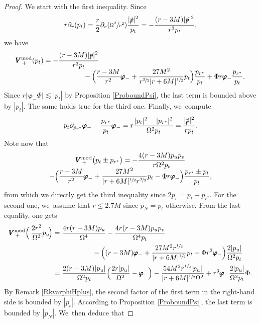 \documentclass[JEP,XML,SOM,Unicode,published]{cedram}
\theoremstyle{plain}
\theoremstyle{definition}
\begin{document}
\begin{proof}
We start with the first inequality. Since
\begin{equation*}
r\partial_r (p_t) = \frac{r}{2}\partial_r(\sfrac{\Omega^2}{r^2}) \frac{|\slashed{p}|^2}{p_t} = - \frac{(r-3M)|\slashed{p}|^2}{r^3 p_t},
\end{equation*}
we have
\begin{align}\label{eq:Vpluspt}
\pmb{V}_{\, +}^{ \mathrm{mod}} (p_t)&= -\frac{(r-3M)|\slashed{p}|^2}{r^3 p_t}\\[-5pt]
&\hspace*{2cm}-\Bigl(\frac{r-3M}{r^2} \pmb{\varphi}_- +\frac{27M^2 }{r^{\sfrac{3}{2}}|r+6M|^{\sfrac{1}{2}}}p_t \Bigr) \frac{p_{r^*}}{p_t}+\Phi r \pmb{\varphi}_- \frac{p_{r^*}}{p_t}.\notag
\end{align}
Since $r |\pmb{\varphi}_- \Phi| \lesssim |p_t|$ by Proposition \ref{ProboundPsi}, the last term is bounded above by $|p_t|$. The same holds true for the third one. Finally, we~compute
\[
p_t \partial_{p_{r^*}} \pmb{\varphi}_- - \frac{p_{r^*}}{p_t} \pmb{\varphi}_- =r\frac{|p_t|^2-|p_{r^*}|^2}{\Omega^2 p_t}=\frac{|\slashed{p}|^2}{rp_t}.
\]
Note now that
\begin{multline*}
\pmb{V}_{\, +}^{ \mathrm{mod}} \bigl(p_t \pm p_{r^*} \bigr)= -\frac{4(r-3M)p_up_v}{r \Omega^2 p_t}\\[-5pt]
-\Bigl(\frac{r-3M}{r^2} \pmb{\varphi}_- +\frac{27M^2 }{|r+6M|^{\sfrac{1}{2}}r^{\sfrac{3}{2}}}p_t-\Phi r \pmb{\varphi}_- \Bigr) \frac{p_{r^*}\pm p_t}{p_t},
\end{multline*}
from which we directly get the third inequality since $2p_v=p_t+p_{r^*}$. For the second one, we~assume that $r \leq 2.7M$ since $p_N=p_t$ otherwise. From the last equality, one gets
\begin{align}
\pmb{V}_{\, +}^{ \mathrm{mod}} \Bigl(\, \frac{2r^2 }{\Omega^2}p_u \! \Bigr) &= \frac{4r(r-3M)p_u}{\Omega^4} -\frac{4r(r-3M)p_up_v}{ \Omega^4 p_t}\notag \\
&\label{eq:VpluspN} \hspace*{2cm} -\Bigl((r-3M) \pmb{\varphi}_- +\frac{27M^2r^{\sfrac{1}{2}} }{|r+6M|^{\sfrac{1}{2}}}p_t-\Phi r^3 \pmb{\varphi}_- \Bigr) \frac{2|p_u|}{\Omega^2p_t} \\
& = \frac{2(r-3M)|p_u|}{\Omega^2p_t} \Bigl(\frac{2r|p_u|}{\Omega^2}- \pmb{\varphi}_- \Bigr)-\frac{54M^2r^{\sfrac{1}{2}}|p_u| }{|r+6M|^{\sfrac{1}{2}} \Omega^2 }+ r^3 \pmb{\varphi}_-\frac{2|p_u|}{\Omega^2p_t} \Phi. \notag
\end{align}
By Remark \ref{RkvarphiHplus}, the second factor of the first term in the right-hand side is bounded by $|p_t|$. According to Proposition \ref{ProboundPsi}, the last term is bounded by $|p_N|$. We~then deduce that

\end{proof}
\end{document}
